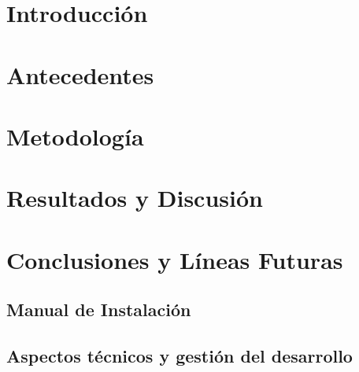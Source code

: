 \documentclass[12pt, a4paper, twoside]{article}
\begin{document}


\clearpage
\setcounter{page}{1}



\newpage



\newpage



\tableofcontents

\section{Introducción}


\section{Antecedentes}


\section{Metodología}



\section{Resultados y Discusión}


\section{Conclusiones y Líneas Futuras}


\printbibliography


\newpage

\begin{umaappendices}
	\section{Manual de Instalación}
  
\end{umaappendices}

\begin{umaappendices}
  	\section{Aspectos técnicos y gestión del desarrollo}
  
  
\end{umaappendices}




\end{document}
